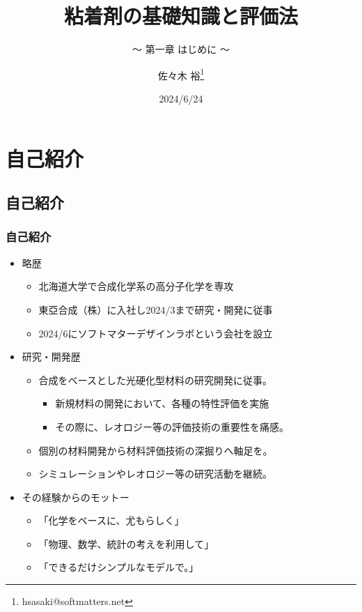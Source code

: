 \documentclass[unicode,12pt]{beamer}%
\title{粘着剤の基礎知識と評価法}
\subtitle{～ 第一章 はじめに ～}
\author[SDL Inc. 佐々木]{佐々木 裕\thanks{hsasaki@softmatters.net}}
\institute[]{元 東亞合成株式会社\\ソフトマターデザインラボ合同会社}
\date{2024/6/24}
\begin{document}
\maketitle

\begin{frame} 
    \tableofcontents[]
\end{frame} 


\section{自己紹介}
\subsection{自己紹介}
\begin{frame}
	\frametitle{自己紹介}
	\begin{itemize}
		\item 略歴
			\begin{itemize}
				\item 北海道大学で合成化学系の高分子化学を専攻
				\item 東亞合成（株）に入社し2024/3まで研究・開発に従事
				\item 2024/6にソフトマターデザインラボという会社を設立
			\end{itemize}
		\item  研究・開発歴
			\begin{itemize}
				\item 合成をベースとした光硬化型材料の研究開発に従事。
				\begin{itemize}
					\item 新規材料の開発において、各種の特性評価を実施
					\item その際に、レオロジー等の評価技術の重要性を痛感。
				\end{itemize}
				\item 個別の材料開発から材料評価技術の深掘りへ軸足を。
				\item シミュレーションやレオロジー等の研究活動を継続。
			\end{itemize}
		\item その経験からのモットー
			\begin{itemize}
				\item 「化学をベースに、尤もらしく」
				\item 「物理、数学、統計の考えを利用して」
				\item 「できるだけシンプルなモデルで。」
			\end{itemize}
	\end{itemize}
\end{frame}
\end{document}
